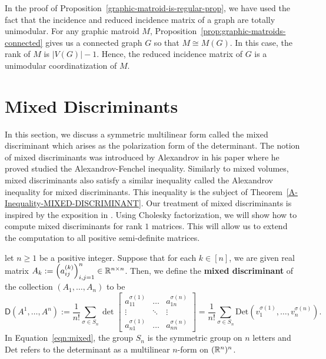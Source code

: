 \documentclass{puthesis-UG}
\begin{document}
In the proof of Proposition~\ref{graphic-matroid-is-regular-prop}, we have used the fact that the incidence and reduced incidence matrix of a graph are totally unimodular. For any graphic matroid $M$, Proposition~\ref{prop:graphic-matroids-connected} gives us a connected graph $G$ so that $M \cong M(G)$. In this case, the rank of $M$ is $|V(G)| - 1$. Hence, the reduced incidence matrix of $G$ is a unimodular coordinatization of $M$.  

\section{Mixed Discriminants} \label{sec:mixed-discriminants}

In this section, we discuss a symmetric multilinear form called the mixed discriminant which arises as the polarization form of the determinant. The notion of mixed discriminants was introduced by Alexandrov in his paper \cite{aleksandrov} where he proved studied the Alexandrov-Fenchel inequality. Similarly to mixed volumes, mixed discriminants also satisfy a similar inequality called the Alexandrov inequality for mixed discriminants. This inequality is the subject of Theorem~\ref{A-Inequality-MIXED-DISCRIMINANT}. Our treatment of mixed discriminants is inspired by the exposition in \cite{bapat_raghavan_1997}. Using Cholesky factorization, we will show how to compute mixed discriminants for rank $1$ matrices. This will allow us to extend the computation to all positive semi-definite matrices. 

\begin{defn} \label{defn-mixed-discriminant}
	let $n \geq 1$ be a positive integer. Suppose that for each $k \in [n]$, we are given real matrix $A_k := \left (a_{ij}^{(k)} \right )_{i, j = 1}^n \in \mathbb{R}^{n \times n}$. Then, we define the \textbf{mixed discriminant} of the collection $(A_1, \ldots, A_n)$ to be 
	\begin{equation} \label{eqn:mixed}
		\mathsf{D}(A^1, \ldots, A^n) := \frac{1}{n!} \sum_{\sigma \in S_n} 
		\det 
		\begin{bmatrix} 
			a_{11}^{\sigma(1)} & \ldots & a_{1n}^{\sigma(n)} \\
			\vdots & \ddots & \vdots \\
			a_{n1}^{\sigma(1)} & \ldots & a_{nn}^{\sigma(n)}
		\end{bmatrix} = \frac{1}{n!} \sum_{\sigma \in S_n} \text{Det} \left (v^{\sigma(1)}_{1}, \ldots, v_{n}^{\sigma(n)} \right ).
	\end{equation}
	In Equation~\ref{eqn:mixed}, the group $S_n$ is the symmetric group on $n$ letters and $\text{Det}$ refers to the determinant as a multilinear $n$-form on $(\mathbb{R}^n)^n$. 
\end{defn}
\end{document}
